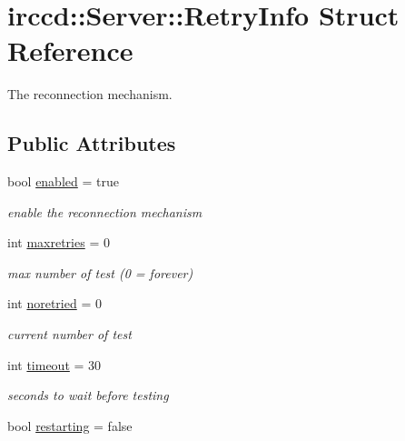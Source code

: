 \hypertarget{a00053}{\section{irccd\-:\-:Server\-:\-:Retry\-Info Struct Reference}
\label{a00053}
}


The reconnection mechanism.  


\subsection*{Public Attributes}
\begin{DoxyCompactItemize}
\item 
\hypertarget{a00053_a9cd814ab565cd92893c220ff520416d8}{bool \hyperlink{a00053_a9cd814ab565cd92893c220ff520416d8}{enabled} = true}\label{a00053_a9cd814ab565cd92893c220ff520416d8}

\begin{DoxyCompactList}\small\item\em enable the reconnection mechanism \end{DoxyCompactList}\item 
\hypertarget{a00053_a2d77426cc037666ea25bf8f0f8423e9e}{int \hyperlink{a00053_a2d77426cc037666ea25bf8f0f8423e9e}{maxretries} = 0}\label{a00053_a2d77426cc037666ea25bf8f0f8423e9e}

\begin{DoxyCompactList}\small\item\em max number of test (0 = forever) \end{DoxyCompactList}\item 
\hypertarget{a00053_aaaa1cb0be6a34a0e40a78b5dc22c4f61}{int \hyperlink{a00053_aaaa1cb0be6a34a0e40a78b5dc22c4f61}{noretried} = 0}\label{a00053_aaaa1cb0be6a34a0e40a78b5dc22c4f61}

\begin{DoxyCompactList}\small\item\em current number of test \end{DoxyCompactList}\item 
\hypertarget{a00053_aebd176b862c108e97f98877673a6bd24}{int \hyperlink{a00053_aebd176b862c108e97f98877673a6bd24}{timeout} = 30}\label{a00053_aebd176b862c108e97f98877673a6bd24}

\begin{DoxyCompactList}\small\item\em seconds to wait before testing \end{DoxyCompactList}\item 
\hypertarget{a00053_ae2b6b52c1ac9d00a0c7f80fbe10f4e79}{bool \hyperlink{a00053_ae2b6b52c1ac9d00a0c7f80fbe10f4e79}{restarting} = false}\label{a00053_ae2b6b52c1ac9d00a0c7f80fbe10f4e79}


\end{DoxyCompactItemize}
